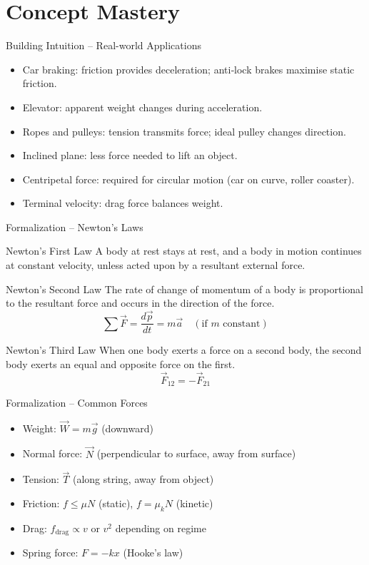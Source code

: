 \documentclass[11pt]{beamer}
\begin{document}
\section{Concept Mastery}

\begin{frame}{Building Intuition – Real-world Applications}
\begin{itemize}
    \item \alert{Car braking}: friction provides deceleration; anti‑lock brakes maximise static friction.
    \item \alert{Elevator}: apparent weight changes during acceleration.
    \item \alert{Ropes and pulleys}: tension transmits force; ideal pulley changes direction.
    \item \alert{Inclined plane}: less force needed to lift an object.
    \item \alert{Centripetal force}: required for circular motion (car on curve, roller coaster).
    \item \alert{Terminal velocity}: drag force balances weight.
\end{itemize}
\end{frame}

\begin{frame}{Formalization – Newton's Laws}
\begin{block}{Newton's First Law}
A body at rest stays at rest, and a body in motion continues at constant velocity, unless acted upon by a resultant external force.
\end{block}
\begin{block}{Newton's Second Law}
The rate of change of momentum of a body is proportional to the resultant force and occurs in the direction of the force.
\[ \sum \vec{F} = \frac{d\vec{p}}{dt} = m\vec{a} \quad (\text{if } m \text{ constant}) \]
\end{block}
\begin{block}{Newton's Third Law}
When one body exerts a force on a second body, the second body exerts an equal and opposite force on the first.
\[ \vec{F}_{12} = -\vec{F}_{21} \]
\end{block}
\end{frame}

\begin{frame}{Formalization – Common Forces}
\begin{itemize}
    \item Weight: $\vec{W} = m\vec{g}$ (downward)
    \item Normal force: $\vec{N}$ (perpendicular to surface, away from surface)
    \item Tension: $\vec{T}$ (along string, away from object)
    \item Friction: $f \le \mu N$ (static), $f = \mu_k N$ (kinetic)
    \item Drag: $f_{\text{drag}} \propto v$ or $v^2$ depending on regime
    \item Spring force: $F = -k x$ (Hooke's law)
\end{itemize}
\end{frame}
\end{document}
